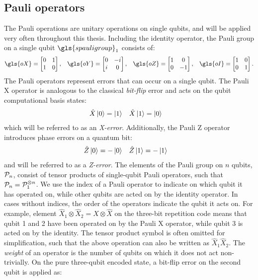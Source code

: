 \subsection{Pauli operators}\label{subsec:pauli}

The Pauli operations are unitary operations on single qubits, and will be applied very often throughout this thesis. Including the identity operator, the Pauli group on a single qubit $\gls{spauligroup}_1$ consists of:
\begin{align}
  \gls{oX} = \begin{bmatrix} 0 & 1 \\ 1 & 0 \end{bmatrix}, &&
  \gls{oY} = \begin{bmatrix} 0 & -i \\ i & 0 \end{bmatrix}, &&
  \gls{oZ} = \begin{bmatrix} 1 & 0 \\ 0 & -1 \end{bmatrix}, &&
  \gls{oI} = \begin{bmatrix} 1 & 0 \\ 0 & 1 \end{bmatrix}.
\end{align}
The Pauli operators represent errors that can occur on a single qubit. The Pauli X operator is analogous to the classical \emph{bit-flip} error and acts on the qubit computational basis states:
\begin{align}\label{eqq:qec_bitflip}
  & \hat{X}\ket{0} = \ket{1} && \hat{X}\ket{1} = \ket{0} &
\end{align}
which will be referred to as an \emph{X-error}. Additionally, the Pauli Z operator introduces phase errors on a quantum bit:
\begin{align}\label{eq:eqc_phaseflip}
  & \hat{Z}\ket{0} = -\ket{0} && \hat{Z}\ket{1} = -\ket{1} &
\end{align}
and will be referred to as a \emph{Z-error}. The elements of the Pauli group on $n$ qubits, $\mathcal{P}_n$, consist of tensor products of single-qubit Pauli operators, such that  $\mathcal{P}_n = \mathcal{P}_1^{\otimes n}$. We use the index of a Pauli operator to indicate on which qubit it has operated on, while other qubits are acted on by the identity operator. In cases without indices, the order of the operators indicate the qubit it acts on. For example, element $\hat{X}_1\otimes \hat{X}_2=\hat{X}\otimes \hat{X}$ on the three-bit repetition code means that qubit 1 and 2 have been operated on by the Pauli X operator, while qubit 3 is acted on by the identity. The tensor product symbol is often omitted for simplification, such that the above operation can also be written as $\hat{X}_1\hat{X}_2$. The \emph{weight} of an operator is the number of qubits on which it does not act non-trivially. On the pure  three-qubit encoded state, a bit-flip error on the second qubit is applied as:
